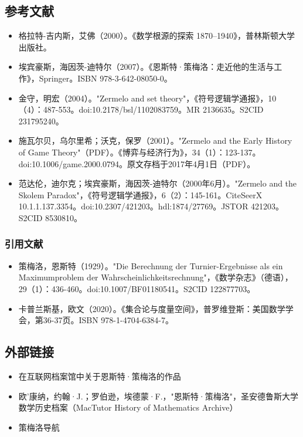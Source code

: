 \subsection{参考文献}
\begin{itemize}
\item 格拉特-吉内斯，艾佛（2000）。《数学根源的探索 1870–1940》，普林斯顿大学出版社。
\item 埃宾豪斯，海因茨-迪特尔（2007）。《恩斯特·策梅洛：走近他的生活与工作》，Springer。ISBN 978-3-642-08050-0。
\item 金守，明宏（2004）。"Zermelo and set theory"，《符号逻辑学通报》，10（4）：487-553。doi:10.2178/bsl/1102083759。MR 2136635。S2CID 231795240。
\item 施瓦尔贝，乌尔里希；沃克，保罗（2001）。"Zermelo and the Early History of Game Theory"（PDF）。《博弈与经济行为》，34（1）：123-137。doi:10.1006/game.2000.0794。原文存档于2017年4月1日（PDF）。
\item 范达伦，迪尔克；埃宾豪斯，海因茨-迪特尔（2000年6月）。"Zermelo and the Skolem Paradox"，《符号逻辑学通报》，6（2）：145-161。CiteSeerX 10.1.1.137.3354。doi:10.2307/421203。hdl:1874/27769。JSTOR 421203。S2CID 8530810。
\end{itemize}
\subsubsection{引用文献}
\begin{itemize}
\item 策梅洛，恩斯特（1929）。"Die Berechnung der Turnier-Ergebnisse als ein Maximumproblem der Wahrscheinlichkeitsrechnung"，《数学杂志》（德语），29（1）：436-460。doi:10.1007/BF01180541。S2CID 122877703。
\item 卡普兰斯基，欧文（2020）。《集合论与度量空间》，普罗维登斯：美国数学学会，第36-37页。ISBN 978-1-4704-6384-7。
\end{itemize}
\subsection{外部链接}
\begin{itemize}
\item 在互联网档案馆中关于恩斯特·策梅洛的作品
\item 欧'康纳，约翰·J.；罗伯逊，埃德蒙·F.，"恩斯特·策梅洛"，圣安德鲁斯大学数学历史档案（MacTutor History of Mathematics Archive）
\item 策梅洛导航
\end{itemize}